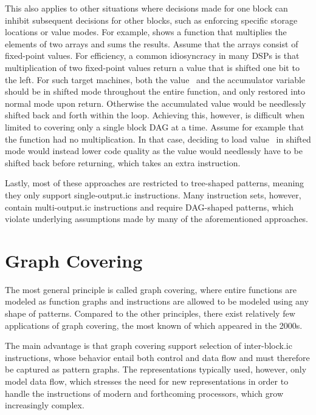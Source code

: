 This also applies to other situations where decisions made for one \gls{block}
can inhibit subsequent decisions for other \glspl{block}, such as enforcing
specific storage locations or value modes.
%
For example,  shows a \gls{function} that
multiplies the elements of two arrays and sums the results.
%
Assume that the arrays consist of fixed-point values.
%
For efficiency, a common idiosyncracy in many \glspl{DSP} is that multiplication
of two fixed-point values return a value that is shifted one bit to the left.
%
For such \glspl{target machine}, both the value~ and the accumulator
\gls{variable}~ should be in shifted mode throughout the entire
\gls{function}, and only restored into normal mode upon return.
%
Otherwise the accumulated value would be needlessly shifted back and forth
within the loop.
%
Achieving this, however, is difficult when limited to covering only a single
\gls{block DAG} at a time.
%
Assume for example that the function had no multiplication.
%
In that case, deciding to load value~ in shifted mode would instead
lower code quality as the value would needlessly have to be shifted back before
returning, which takes an extra \gls{instruction}.

Lastly, most of these approaches are restricted to tree-shaped \glspl{pattern},
meaning they only support \gls{single-output.ic} \glspl{instruction}.
%
Many \glspl{instruction set}, however, contain \gls{multi-output.ic}
\glspl{instruction} and require \gls{DAG}-shaped \glspl{pattern}, which violate
underlying assumptions made by many of the aforementioned approaches.


\section{Graph Covering}

The most general principle is called \gls{graph covering}, where entire
\glspl{function} are modeled as \glspl{function graph} and \glspl{instruction}
are allowed to be modeled using any shape of \glspl{pattern}.
%
Compared to the other \glspl{principle}, there exist relatively few applications
of \gls{graph covering}, the most known of which appeared in the 2000s.

The main advantage is that \gls{graph covering} support selection of
\gls{inter-block.ic} \glspl{instruction}, whose behavior entail both control and
data flow and must therefore be captured as \glspl{pattern graph}.
%
The representations typically used, however, only model data flow, which
stresses the need for new representations in order to handle the
\glspl{instruction} of modern and forthcoming processors, which grow
increasingly complex.

